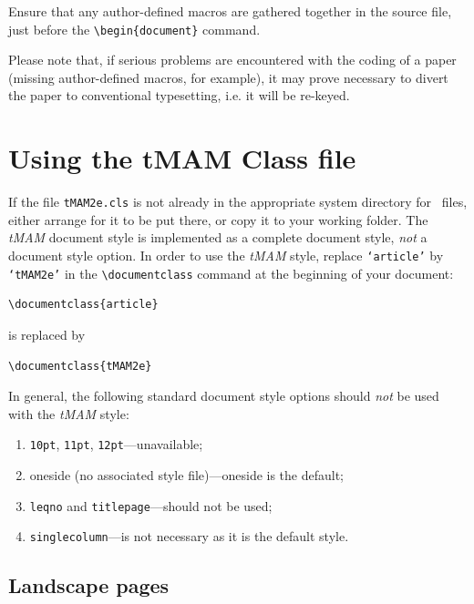 \documentclass[]{tMAM2e}
\begin{document}
Ensure that any author-defined macros are gathered together in the source file, just before the
\verb"\begin{document}" command.

Please note that, if serious problems are encountered with the coding of a paper (missing author-defined macros,
for example), it may prove necessary to divert the paper to conventional typesetting, i.e. it will be re-keyed.

\section{Using the {\bi tMAM} Class file}

If the file {\tt tMAM2e.cls} is not already in the appropriate system directory for \LaTeXe\ files, either
arrange for it to be put there, or copy it to your working folder. The {\it tMAM} document style is implemented
as a complete document style, {\em not\/} a document style option. In order to use the {\it tMAM} style, replace
{\tt `article'} by {\tt `tMAM2e'} in the \verb"\documentclass" command at the beginning of your document:
%
\begin{verbatim}
\documentclass{article}
\end{verbatim}
%
is replaced by
%
\begin{verbatim}
\documentclass{tMAM2e}
\end{verbatim}
%
In general, the following standard document style options should
{\em not\/} be used with the {\it tMAM} style:
%
\begin{enumerate}
   \item {\tt 10pt}, {\tt 11pt}, {\tt 12pt}---unavailable;
\item oneside (no associated style file)---oneside is the default;
   \item {\tt leqno} and {\tt titlepage}---should not be used;
   \item {\tt singlecolumn}---is not necessary as it is the default style.
\end{enumerate}
%

\subsection{Landscape pages}\label{eps}
\end{document}
